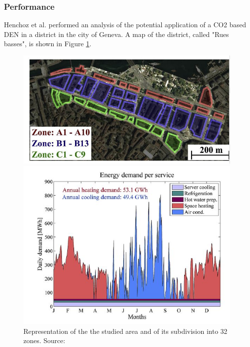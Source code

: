 \documentclass{article}
\begin{document}

\subsubsection{Performance}
Henchoz et al.\cite{henchozPotentialRefrigerantBased} performed an analysis of the potential application of a CO2 based DEN in a district in the city of Geneva. A map of the district, called "Rues basses", is shown in Figure \ref{fig:henchoz_gva}.

\begin{figure}[!htb]
	\centering
	\begin{minipage}{.45\textwidth}
		\centering
		\includegraphics[width=\textwidth,height=0.2\textheight]{henchoz_gva.JPG}
		\caption{Representation of the the studied area and of its subdivision into 32 zones. Source: \cite{henchozPotentialRefrigerantBased}}
		\label{fig:henchoz_gva}
	\end{minipage}%
\hspace{1cm}
	\begin{minipage}{0.45\textwidth}
		\centering
		\includegraphics[width=\textwidth,height=0.2\textheight]{henchoz_energydemand.JPG}

\end{minipage}
\end{figure}
\end{document}
